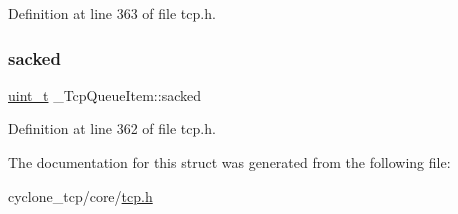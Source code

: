 Definition at line 363 of file tcp.\+h.

\mbox{\label{struct__TcpQueueItem_a18ca123a9505da49954d6af37058c6fd}} 
\subsubsection{\texorpdfstring{sacked}{sacked}}
{\footnotesize\ttfamily \hyperlink{compiler__port_8h_a12a1e9b3ce141648783a82445d02b58d}{uint\+\_\+t} \+\_\+\+Tcp\+Queue\+Item\+::sacked}



Definition at line 362 of file tcp.\+h.



The documentation for this struct was generated from the following file\+:\begin{DoxyCompactItemize}
\item 
cyclone\+\_\+tcp/core/\hyperlink{tcp_8h}{tcp.\+h}\end{DoxyCompactItemize}
